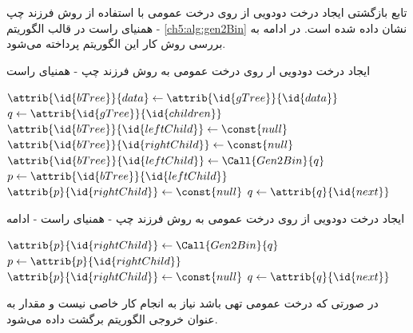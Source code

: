 تابع بازگشتی ایجاد درخت دودویی از روی درخت عمومی با استفاده از روش فرزند چپ - همنیای راست در قالب الگوریتم {\eqref{ch5:alg:gen2Bin}} نشان داده شده است. در ادامه به بررسی روش کار این الگوریتم پرداخته می‌شود.

\begin{algorithm}[H]
\caption{ایجاد درخت دودویی ار روی درخت عمومی به روش فرزند چپ - همنیای راست}\label{ch5:alg:gen2Bin}
\begin{latin}
\begin{algorithmic}[1]
				\State	\Return {}
		\EndIf
		\State	{}\label{ch5:alg:ln:oneNodeGTreeBegin}
		\State	$\attrib{\id{bTree}}{data} \gets \attrib{\id{gTree}}{\id{data}}$
		\State	$q \gets \attrib{\id{gTree}}{\id{children}}$
				\State	$\attrib{\id{bTree}}{\id{leftChild}} \gets \const{null}$
				\State	$\attrib{\id{bTree}}{\id{rightChild}} \gets \const{null}$
				\State	\Return {}
		\EndIf\label{ch5:alg:ln:oneNodeGTreeEnd}
		\State	$\attrib{\id{bTree}}{\id{leftChild}} \gets \Call{Gen2Bin}{q}$\label{ch5:alg:ln:Gen2BinRecCasePt1Begin}
		\State	$p \gets \attrib{\id{bTree}}{\id{leftChild}}$
		\State	$\attrib{p}{\id{rightChild}} \gets \const{null}$
		\State	$q \gets \attrib{q}{\id{next}}$\label{ch5:alg:ln:Gen2BinRecCasePt1End}
\end{algorithmic}
\end{latin}
\end{algorithm}

\begin{algorithm}
\caption*{ایجاد درخت دودویی از روی درخت عمومی به روش فرزند چپ - همنیای راست - ادامه}
\begin{latin}
\begin{algorithmic}[1]
		\label{ch5:alg:ln:Gen2BinRecCasePt2Begin}
				\State	$\attrib{p}{\id{rightChild}} \gets \Call{Gen2Bin}{q}$
				\State	$p \gets \attrib{p}{\id{rightChild}}$
				\State	$\attrib{p}{\id{rightChild}} \gets \const{null}$
				\State	$q \gets \attrib{q}{\id{next}}$
		\EndWhile\label{ch5:alg:ln:Gen2BinRecCasePt2End}
		\State	\Return {}
\EndFunction	
\end{algorithmic}
\end{latin}
\end{algorithm}

در صورتی که درخت عمومی تهی باشد نیاز به انجام کار خاصی نیست و مقدار {} به عنوان خروجی الگوریتم برگشت داده می‌شود.

